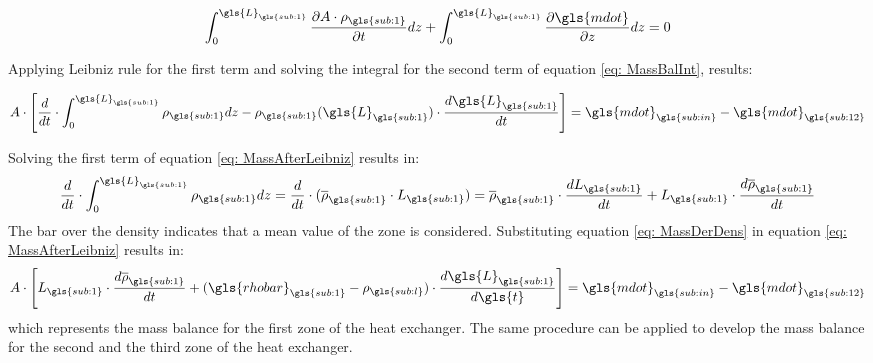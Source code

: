 \documentclass[11pt]{article} %
\begin{document}
\begin{equation}
\int_{0}^{\gls{L}_{\gls{sub:1}}}  \frac{\partial A \cdot \rho_{\gls{sub:1}} }{\partial t} dz + \int_{0}^{\gls{L}_{\gls{sub:1}}} \frac{\partial \gls{mdot}}{\partial z} dz= 0
\label{eq: MassBalInt}
\end{equation}

Applying Leibniz rule for the first term and solving the integral for the second term of equation \ref{eq: MassBalInt}, results:

\begin{equation}
A \cdot \left[  \frac{d}{dt} \cdot \int_{0}^{\gls{L}_{\gls{sub:1}}} \rho_{\gls{sub:1}} dz - \rho_{\gls{sub:1}}(\gls{L}_{\gls{sub:1}}) \cdot \frac{d\gls{L}_{\gls{sub:1}}}{dt} \right] = \gls{mdot}_{\gls{sub:in}} - \gls{mdot}_{\gls{sub:12}}
\label{eq: MassAfterLeibniz}
\end{equation}

Solving the  first term of equation \ref{eq: MassAfterLeibniz} results in:
\begin{equation}
 \frac{d}{dt} \cdot \int_{0}^{\gls{L}_{\gls{sub:1}}} \rho_{\gls{sub:1}} dz =  \frac{d}{dt} \cdot (\overline{\rho}_{\gls{sub:1}} \cdot L_{\gls{sub:1}}) = \overline{\rho}_{\gls{sub:1}} \cdot \frac{dL_{\gls{sub:1}}}{dt} + L_{\gls{sub:1}} \cdot \frac{d\overline{\rho}_{\gls{sub:1}}}{dt}
\label{eq: MassDerDens}
\end{equation}
The bar over the density indicates that a mean value of the zone is considered. Substituting equation \ref{eq: MassDerDens} in equation \ref{eq: MassAfterLeibniz} results in:
\begin{equation}
A \cdot \left[ L_{\gls{sub:1}} \cdot \frac{d\overline{\rho}_{\gls{sub:1}}}{dt}  + (\gls{rhobar}_{\gls{sub:1}} - \rho_{\gls{sub:l}}) \cdot \frac{d \gls{L}_{\gls{sub:1}}}{d \gls{t}}\right] = \gls{mdot}_{\gls{sub:in}} -  \gls{mdot}_{\gls{sub:12}}
\end{equation}
which represents the mass balance for the first zone of the heat exchanger. The same procedure can be applied to develop the mass balance for the second and the third zone of the heat exchanger.

\end{document}
